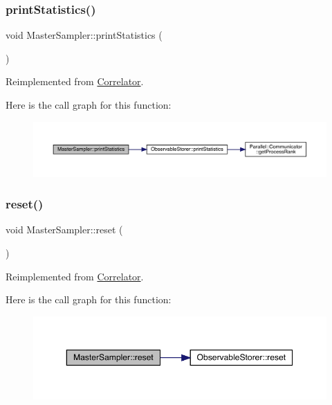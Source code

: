 \subsubsection{\texorpdfstring{printStatistics()}{printStatistics()}}
{\footnotesize\ttfamily void Master\+Sampler\+::print\+Statistics (\begin{DoxyParamCaption}{ }\end{DoxyParamCaption})\hspace{0.3cm}{\ttfamily [virtual]}}



Reimplemented from \mbox{\hyperlink{class_correlator_a2168d677f547769784781d2e2aaa53cf}{Correlator}}.

Here is the call graph for this function\+:\nopagebreak
\begin{figure}[H]
\begin{center}
\leavevmode
\includegraphics[width=350pt]{class_master_sampler_a9accfc83c05d3013396355e40257a562_cgraph}
\end{center}
\end{figure}
\mbox{\label{class_master_sampler_a275a032513db03c899056fd07d71cc89}} 
\subsubsection{\texorpdfstring{reset()}{reset()}}
{\footnotesize\ttfamily void Master\+Sampler\+::reset (\begin{DoxyParamCaption}{ }\end{DoxyParamCaption})\hspace{0.3cm}{\ttfamily [virtual]}}



Reimplemented from \mbox{\hyperlink{class_correlator_aacca40262d2cd62f0a3964e832f948c1}{Correlator}}.

Here is the call graph for this function\+:\nopagebreak
\begin{figure}[H]
\begin{center}
\leavevmode
\includegraphics[width=350pt]{class_master_sampler_a275a032513db03c899056fd07d71cc89_cgraph}
\end{center}
\end{figure}
\mbox{\label{class_master_sampler_ab7913d0dbdea57af3f469a3cdd74f8fc}} 
